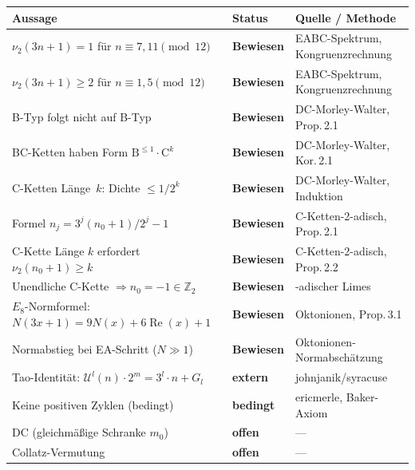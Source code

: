 \documentclass[12pt,a4paper]{article}
\newcommand{\vii}{\nu_2}
\newcommand{\U}{\mathcal{U}}
\newcommand{\Ztwo}{\mathbb{Z}_2}
\begin{document}
\begin{center}
\renewcommand{\arraystretch}{1.45}
\begin{tabular}{>{\raggedright}p{5.8cm} >{\centering}p{2.8cm} >{\raggedright\arraybackslash}p{4.5cm}}
\toprule
\textbf{Aussage} & \textbf{Status} & \textbf{Quelle / Methode} \\
\midrule
$\vii(3n+1) = 1$ für $n \equiv 7,11 \pmod{12}$
  & \textcolor{bewiesengrün}{\bfseries Bewiesen}
  & EABC-Spektrum, Kongruenzrechnung \\[2pt]
$\vii(3n+1) \geq 2$ für $n \equiv 1,5 \pmod{12}$
  & \textcolor{bewiesengrün}{\bfseries Bewiesen}
  & EABC-Spektrum, Kongruenzrechnung \\[2pt]
B-Typ folgt nicht auf B-Typ
  & \textcolor{bewiesengrün}{\bfseries Bewiesen}
  & DC-Morley-Walter, Prop.\,2.1 \\[2pt]
BC-Ketten haben Form $\mathrm{B}^{\leq 1}\cdot\mathrm{C}^k$
  & \textcolor{bewiesengrün}{\bfseries Bewiesen}
  & DC-Morley-Walter, Kor.\,2.1 \\[2pt]
C-Ketten Länge~$k$: Dichte $\leq 1/2^k$
  & \textcolor{bewiesengrün}{\bfseries Bewiesen}
  & DC-Morley-Walter, Induktion \\[2pt]
Formel $n_j = 3^j(n_0+1)/2^j - 1$
  & \textcolor{bewiesengrün}{\bfseries Bewiesen}
  & C-Ketten-2-adisch, Prop.\,2.1 \\[2pt]
C-Kette Länge $k$ erfordert $\vii(n_0+1) \geq k$
  & \textcolor{bewiesengrün}{\bfseries Bewiesen}
  & C-Ketten-2-adisch, Prop.\,2.2 \\[2pt]
Unendliche C-Kette $\Rightarrow n_0 = -1 \in \Ztwo$
  & \textcolor{bewiesengrün}{\bfseries Bewiesen}
  & 2-adischer Limes \\[2pt]
$E_8$-Normformel: $N(3x+1) = 9N(x)+6\operatorname{Re}(x)+1$
  & \textcolor{bewiesengrün}{\bfseries Bewiesen}
  & Oktonionen, Prop.\,3.1 \\[2pt]
Normabstieg bei EA-Schritt ($N \gg 1$)
  & \textcolor{bewiesengrün}{\bfseries Bewiesen}
  & Oktonionen-Normabschätzung \\[2pt]
Tao-Identität: $\U^l(n)\cdot 2^m = 3^l\cdot n + G_l$
  & \textcolor{warnorange}{\bfseries extern}
  & johnjanik/syracuse \\[2pt]
Keine positiven Zyklen (bedingt)
  & \textcolor{warnorange}{\bfseries bedingt}
  & ericmerle, Baker-Axiom \\[2pt]
DC (gleichmäßige Schranke $m_0$)
  & \textcolor{lückenrot}{\bfseries offen}
  & --- \\[2pt]
Collatz-Vermutung
  & \textcolor{lückenrot}{\bfseries offen}
  & --- \\
\bottomrule
\end{tabular}
\end{center}
\end{document}
